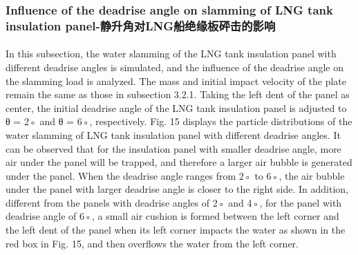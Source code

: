 \documentclass[UTF8]{ctexart}
\begin{document}
\subsubsection{Influence of the deadrise angle on slamming of LNG tank insulation panel-静升角对LNG船绝缘板砰击的影响}
\paragraph{\quad}In this subsection, the water slamming of the LNG tank insulation panel with different 
                deadrise angles is simulated, and the influence of the deadrise angle on the slamming load is analyzed. 
                The mass and initial impact velocity of the plate remain the same as those in subsection 3.2.1. Taking 
                the left dent of the panel as center, the initial deadrise angle of the LNG tank insulation panel is 
                adjusted to θ = 2◦ and θ = 6◦, respectively. Fig. 15 displays the particle distributions of the water 
                slamming of LNG tank insulation panel with different deadrise angles. It can be observed that for the 
                insulation panel with smaller deadrise angle, more air under the panel will be trapped, and therefore a 
                larger air bubble is generated under the panel. When the deadrise angle ranges from 2◦ to 6◦, the air bubble 
                under the panel with larger deadrise angle is closer to the right side. In addition, different from the panels 
                with deadrise angles of 2◦ and 4◦, for the panel with deadrise angle of 6◦, a small air cushion is formed 
                between the left corner and the left dent of the panel when its left corner impacts the water as shown in 
                the red box in Fig. 15, and then overflows the water from the left corner.
\end{document}
